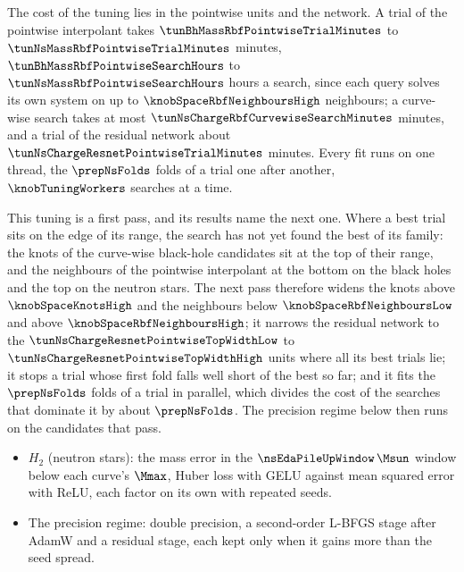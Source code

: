 The cost of the tuning lies in the pointwise units and the network. A trial of the pointwise interpolant takes $\tunBhMassRbfPointwiseTrialMinutes$ to $\tunNsMassRbfPointwiseTrialMinutes$ minutes, $\tunBhMassRbfPointwiseSearchHours$ to $\tunNsMassRbfPointwiseSearchHours$ hours a search, since each query solves its own system on up to $\knobSpaceRbfNeighboursHigh$ neighbours; a curve-wise search takes at most $\tunNsChargeRbfCurvewiseSearchMinutes$ minutes, and a trial of the residual network about $\tunNsChargeResnetPointwiseTrialMinutes$ minutes. Every fit runs on one thread, the $\prepNsFolds$ folds of a trial one after another, $\knobTuningWorkers$ searches at a time.

This tuning is a first pass, and its results name the next one. Where a best trial sits on the edge of its range, the search has not yet found the best of its family: the knots of the curve-wise black-hole candidates sit at the top of their range, and the neighbours of the pointwise interpolant at the bottom on the black holes and the top on the neutron stars. The next pass therefore widens the knots above $\knobSpaceKnotsHigh$ and the neighbours below $\knobSpaceRbfNeighboursLow$ and above $\knobSpaceRbfNeighboursHigh$; it narrows the residual network to the $\tunNsChargeResnetPointwiseTopWidthLow$ to $\tunNsChargeResnetPointwiseTopWidthHigh$ units where all its best trials lie; it stops a trial whose first fold falls well short of the best so far; and it fits the $\prepNsFolds$ folds of a trial in parallel, which divides the cost of the searches that dominate it by about $\prepNsFolds$. The precision regime below then runs on the candidates that pass.

\FloatBarrier

\begin{itemize}
  \item $H_2$ (neutron stars): the mass error in the $\nsEdaPileUpWindow\,\Msun$ window below each curve's $\Mmax$, Huber loss with GELU against mean squared error with ReLU, each factor on its own with repeated seeds.
  \item The precision regime: double precision, a second-order L-BFGS stage after AdamW and a residual stage, each kept only when it gains more than the seed spread.
\end{itemize}
